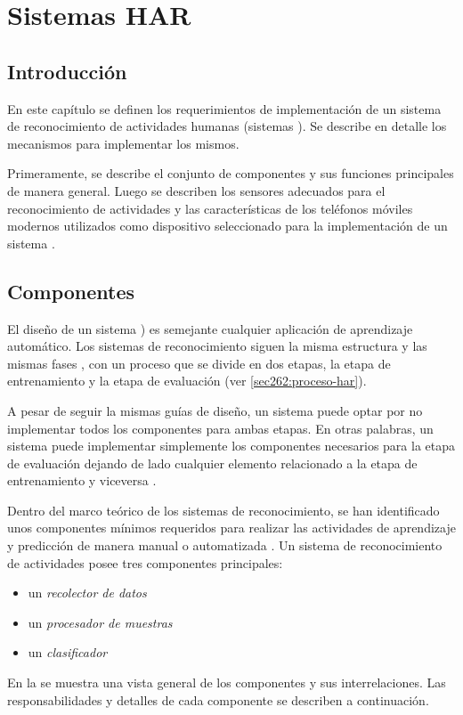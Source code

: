 
\chapter{Sistemas HAR }

\label{chap4:sistemas-de-reconocimiento}

\section{Introducción}

\label{sec41:introduccion}

En este capítulo se definen los requerimientos de implementación de
un sistema de reconocimiento de actividades humanas (sistemas ).
Se describe en detalle los mecanismos para implementar los mismos. 

Primeramente, se describe el conjunto de componentes y sus funciones
principales de manera general. Luego se describen los sensores adecuados
para el reconocimiento de actividades y las características de los
teléfonos móviles modernos utilizados como dispositivo seleccionado
para la implementación de un sistema .

\section{Componentes}

El diseño de un sistema ) es semejante cualquier aplicación
de aprendizaje automático. Los sistemas de reconocimiento siguen la
misma estructura y las mismas fases \cite{LaraLabrador2013}, con
un proceso que se divide en dos etapas, la etapa de entrenamiento
y la etapa de evaluación (ver \ref{sec262:proceso-har}). 

A pesar de seguir la mismas guías de diseño, un sistema puede optar
por no implementar todos los componentes para ambas etapas. En otras
palabras, un sistema puede implementar simplemente los componentes
necesarios para la etapa de evaluación dejando de lado cualquier elemento
relacionado a la etapa de entrenamiento y viceversa . 

Dentro del marco teórico de los sistemas de reconocimiento, se han
identificado unos componentes mínimos requeridos para realizar las
actividades de aprendizaje y predicción de manera manual o automatizada
\cite{Choudhury2008}. Un sistema de reconocimiento de actividades
posee tres componentes principales:
\begin{itemize}
\item un \emph{recolector de datos}
\item un\emph{ procesador de muestras} 
\item un \emph{clasificador }
\end{itemize}
En la  se muestra una vista general
de los componentes y sus interrelaciones. Las responsabilidades y
detalles de cada componente se describen a continuación. 

